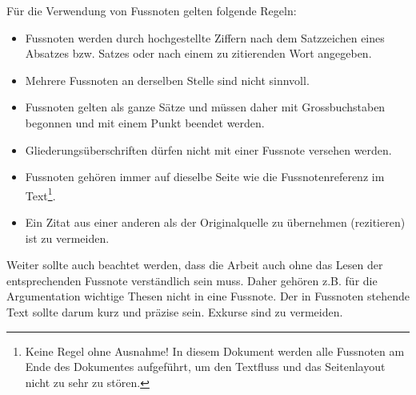 Für die Verwendung von Fussnoten gelten folgende Regeln:


\begin{itemize} 
\item Fussnoten werden durch hochgestellte Ziffern nach dem Satzzeichen eines Absatzes bzw. Satzes oder nach einem zu zitierenden Wort angegeben. 

\item Mehrere Fussnoten an derselben Stelle sind nicht sinnvoll. 

\item Fussnoten gelten als ganze Sätze und müssen daher mit Grossbuchstaben begonnen und mit einem Punkt beendet werden. 

\item Gliederungsüberschriften dürfen nicht mit einer Fussnote versehen werden. 

\item Fussnoten gehören immer auf dieselbe Seite wie die Fussnotenreferenz im Text\footnote{Keine Regel ohne Ausnahme! In diesem Dokument werden alle Fussnoten am Ende des Dokumentes aufgeführt, um den Textfluss und das Seitenlayout nicht zu sehr zu stören.}. 

\item Ein Zitat aus einer anderen als der Originalquelle zu übernehmen (rezitieren) ist zu vermeiden.

\end{itemize}

Weiter sollte auch beachtet werden, dass die Arbeit auch ohne das Lesen der entsprechenden Fussnote verständlich sein muss. Daher gehören z.B. für die Argumentation wichtige Thesen nicht in eine Fussnote. Der in Fussnoten stehende Text sollte darum kurz und präzise sein. Exkurse sind zu vermeiden.

